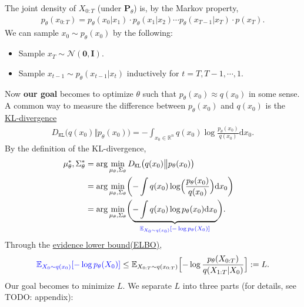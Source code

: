 \documentclass[
]{article}
\providecommand{\tightlist}{%
  \setlength{\itemsep}{0pt}\setlength{\parskip}{0pt}}\usepackage{longtable,booktabs,array}
\theoremstyle{remark}
\begin{document}
The joint density of \(X_{0:T}\) (under \(\mathbf{P}_{\theta}\)) is, by
the Markov property, \[
\begin{aligned}
  p_{\theta}(x_{0:T}) = p_{\theta}(x_0 \vert x_1) \cdot p_{\theta}(x_1\vert x_2) \cdots p_{\theta}(x_{T-1}\vert x_T) \cdot p(x_T).
\end{aligned}
\] We can sample \(x_0\sim p_{\theta}(x_0)\) by the following:

\begin{itemize}
\tightlist
\item
  Sample \(x_T\sim \mathcal{N}(\mathbf{0},\mathbf{I}).\)
\item
  Sample \(x_{t-1}\sim p_{\theta}(x_{t-1}\vert x_t)\) inductively for
  \(t=T,T-1,\cdots,1.\)
\end{itemize}

Now \textbf{our goal} becomes to optimize \(\theta\) such that
\(p_{\theta}(x_0)\approx q(x_0)\) in some sense. A common way to measure
the difference between \(p_{\theta}(x_0)\) and \(q(x_0)\) is the
\href{https://en.wikipedia.org/wiki/Kullback–Leibler_divergence}{KL-divergence}
\[
\begin{aligned}
  D_{\mathtt{KL}} \bigl( q(x_0) \Vert p_{\theta}(x_0) \bigr) 
  = - \int_{x_0\in \mathbb R^n} q(x_0) \log \frac{p_{\theta}(x_0)}{q(x_0)} \mathrm{d}x_0.
\end{aligned}
\] By the definition of the KL-divergence, \[
\begin{aligned}
\mu_{\theta}^*, \Sigma_{\theta}^* 
&= \arg \min_{\mu_{\theta},\Sigma_{\theta}} D_{\mathtt{KL}} \bigl( q(x_0) \big\Vert p_{\theta}(x_0) \bigr) \cr 
&= \arg \min_{\mu_\theta,\Sigma_\theta} \biggl( -\int q(x_0) \log \Bigl( \frac{p_{\theta}(x_0)}{q(x_0)} \Bigr) \mathrm{d}x_0 \biggr) \cr
&= \arg \min_{\mu_{\theta},\Sigma_{\theta}} \biggl( \underbrace{-\int q(x_0) \log p_{\theta}(x_0) \mathrm{d}x_0}_{\color{blue}{\mathbb E_{X_0\sim q(x_0)}[-\log p_{\theta}(X_0)]}} \biggr).
\end{aligned}
\] Through the
\href{https://en.wikipedia.org/wiki/Evidence_lower_bound}{evidence lower
bound(ELBO)}, \[
\begin{aligned}
  {\color{blue}{\mathbb E_{X_0\sim q(x_0)}[-\log p_{\theta}(X_0)]}} \leq 
  \mathbb E_{X_{0:T}\sim q(x_{0:T})} \Bigl[ -\log \frac{p_{\theta}(X_{0:T})}{q(X_{1:T}\vert X_0)} \Bigr]:= L.
\end{aligned}
\] Our goal becomes to minimize \(L.\) We separate \(L\) into three
parts (for details, see TODO: appendix):
\end{document}
